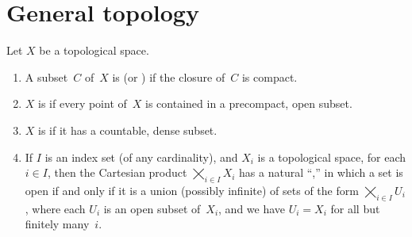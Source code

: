 









\section{General topology} \label{TopologySect}

\begin{defns}
Let $X$ be a topological space.
	\begin{enumerate}
	\item A subset~$C$ of~$X$ is  (or ) if the closure of~$C$ is compact.
	\item $X$ is  if every point of~$X$ is contained in a precompact, open subset.
	\item $X$ is  if it has a countable, dense subset.
	\item If $I$ is an index set (of any cardinality), and $X_i$ is a topological space, for each $i \in I$, then the Cartesian product $\bigtimes_{i \in I} X_i$ has a natural ``\zz,'' in which a set is open if and only if it is a union (possibly infinite) of sets of the form $\bigtimes_{i \in I} U_i$, where each $U_i$ is an open subset of~$X_i$, and we have $U_i = X_i$ for all but finitely many~$i$.
	
	\end{enumerate}
\end{defns}


